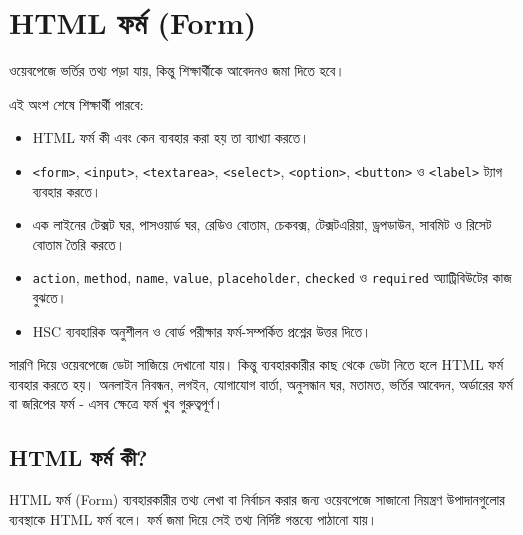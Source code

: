 \section{HTML ফর্ম (Form)}

ওয়েবপেজে ভর্তির তথ্য পড়া যায়, কিন্তু শিক্ষার্থীকে আবেদনও জমা দিতে হবে।



\begin{learningbox}
এই অংশ শেষে শিক্ষার্থী পারবে:
\begin{itemize}
\item HTML ফর্ম কী এবং কেন ব্যবহার করা হয় তা ব্যাখ্যা করতে।
\item \texttt{<form>}, \texttt{<input>}, \texttt{<textarea>}, \texttt{<select>}, \texttt{<option>}, \texttt{<button>} ও \texttt{<label>} ট্যাগ ব্যবহার করতে।
\item এক লাইনের টেক্সট ঘর, পাসওয়ার্ড ঘর, রেডিও বোতাম, চেকবক্স, টেক্সটএরিয়া, ড্রপডাউন, সাবমিট ও রিসেট বোতাম তৈরি করতে।
\item \texttt{action}, \texttt{method}, \texttt{name}, \texttt{value}, \texttt{placeholder}, \texttt{checked} ও \texttt{required} অ্যাট্রিবিউটের কাজ বুঝতে।
\item HSC ব্যবহারিক অনুশীলন ও বোর্ড পরীক্ষার ফর্ম-সম্পর্কিত প্রশ্নের উত্তর দিতে।
\end{itemize}
\end{learningbox}

সারণি দিয়ে ওয়েবপেজে ডেটা সাজিয়ে দেখানো যায়। কিন্তু ব্যবহারকারীর কাছ থেকে ডেটা নিতে হলে HTML ফর্ম ব্যবহার করতে হয়। অনলাইন নিবন্ধন, লগইন, যোগাযোগ বার্তা, অনুসন্ধান ঘর, মতামত, ভর্তির আবেদন, অর্ডারের ফর্ম বা জরিপের ফর্ম - এসব ক্ষেত্রে ফর্ম খুব গুরুত্বপূর্ণ।

\subsection{HTML ফর্ম কী?}

\begin{definitionbox}{HTML ফর্ম (Form)}
ব্যবহারকারীর তথ্য লেখা বা নির্বাচন করার জন্য ওয়েবপেজে সাজানো নিয়ন্ত্রণ উপাদানগুলোর ব্যবস্থাকে HTML ফর্ম বলে। ফর্ম জমা দিয়ে সেই তথ্য নির্দিষ্ট গন্তব্যে পাঠানো যায়।
\end{definitionbox}

